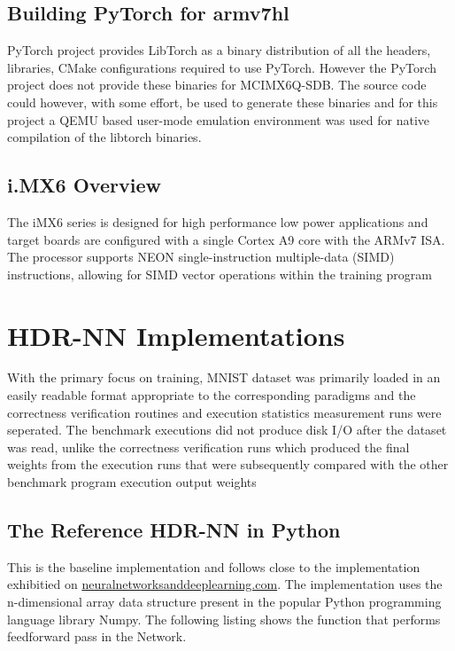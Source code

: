 \subsection{Building PyTorch for armv7hl}

PyTorch project provides LibTorch as a binary distribution of all the headers, libraries, CMake configurations required to use PyTorch. However the PyTorch project does not provide these binaries for MCIMX6Q-SDB. The source code could however, with some effort, be used to generate these binaries and for this project a QEMU based user-mode emulation environment was used for native compilation of the libtorch binaries.

\subsection{i.MX6 Overview}

The iMX6 series is designed for high performance low power applications and target boards are configured with a single Cortex A9 core with the ARMv7 ISA. The processor supports NEON single-instruction multiple-data (SIMD) instructions, allowing for SIMD vector operations within the training program

\section{HDR-NN Implementations}

With the primary focus on training, MNIST dataset was primarily loaded in an easily readable format appropriate to the corresponding paradigms and the correctness verification routines and execution statistics measurement runs were seperated. The benchmark executions did not produce disk I/O after the dataset was read, unlike the correctness verification runs which produced the final weights from the execution runs that were subsequently compared with the other benchmark program execution output weights

\subsection{The Reference HDR-NN in Python}

This is the baseline implementation and follows close to the implementation exhibitied on \href{http://neuralnetworksanddeeplearning.com}{neuralnetworksanddeeplearning.com}. The implementation uses the n-dimensional array data structure present in the popular Python programming language library Numpy. The following listing shows the function that performs feedforward pass in the Network.

